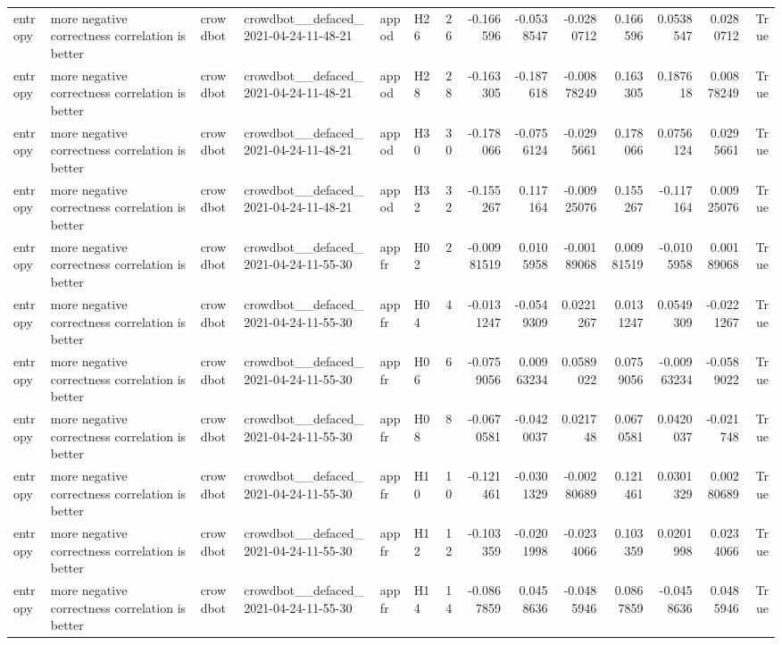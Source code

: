 \begin{longtable}{llllllrrrrrrrr}
entropy & more negative correctness correlation is better & crowdbot & crowdbot\_\_defaced\_2021-04-24-11-48-21 & appod & H26 & 26 & -0.166596 & -0.0538547 & -0.0280712 & 0.166596 & 0.0538547 & 0.0280712 & True \\
entropy & more negative correctness correlation is better & crowdbot & crowdbot\_\_defaced\_2021-04-24-11-48-21 & appod & H28 & 28 & -0.163305 & -0.187618 & -0.00878249 & 0.163305 & 0.187618 & 0.00878249 & True \\
entropy & more negative correctness correlation is better & crowdbot & crowdbot\_\_defaced\_2021-04-24-11-48-21 & appod & H30 & 30 & -0.178066 & -0.0756124 & -0.0295661 & 0.178066 & 0.0756124 & 0.0295661 & True \\
entropy & more negative correctness correlation is better & crowdbot & crowdbot\_\_defaced\_2021-04-24-11-48-21 & appod & H32 & 32 & -0.155267 & 0.117164 & -0.00925076 & 0.155267 & -0.117164 & 0.00925076 & True \\
entropy & more negative correctness correlation is better & crowdbot & crowdbot\_\_defaced\_2021-04-24-11-55-30 & appfr & H02 & 2 & -0.00981519 & 0.0105958 & -0.00189068 & 0.00981519 & -0.0105958 & 0.00189068 & True \\
entropy & more negative correctness correlation is better & crowdbot & crowdbot\_\_defaced\_2021-04-24-11-55-30 & appfr & H04 & 4 & -0.0131247 & -0.0549309 & 0.0221267 & 0.0131247 & 0.0549309 & -0.0221267 & True \\
entropy & more negative correctness correlation is better & crowdbot & crowdbot\_\_defaced\_2021-04-24-11-55-30 & appfr & H06 & 6 & -0.0759056 & 0.00963234 & 0.0589022 & 0.0759056 & -0.00963234 & -0.0589022 & True \\
entropy & more negative correctness correlation is better & crowdbot & crowdbot\_\_defaced\_2021-04-24-11-55-30 & appfr & H08 & 8 & -0.0670581 & -0.0420037 & 0.021748 & 0.0670581 & 0.0420037 & -0.021748 & True \\
entropy & more negative correctness correlation is better & crowdbot & crowdbot\_\_defaced\_2021-04-24-11-55-30 & appfr & H10 & 10 & -0.121461 & -0.0301329 & -0.00280689 & 0.121461 & 0.0301329 & 0.00280689 & True \\
entropy & more negative correctness correlation is better & crowdbot & crowdbot\_\_defaced\_2021-04-24-11-55-30 & appfr & H12 & 12 & -0.103359 & -0.0201998 & -0.0234066 & 0.103359 & 0.0201998 & 0.0234066 & True \\
entropy & more negative correctness correlation is better & crowdbot & crowdbot\_\_defaced\_2021-04-24-11-55-30 & appfr & H14 & 14 & -0.0867859 & 0.0458636 & -0.0485946 & 0.0867859 & -0.0458636 & 0.0485946 & True \\

\end{longtable}
